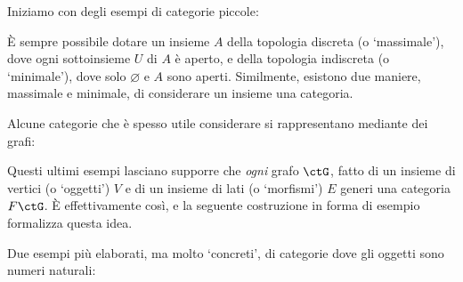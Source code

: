 Iniziamo con degli esempi di categorie piccole:
\begin{example}
\end{example}
\begin{example}
\end{example}
\`E sempre possibile dotare un insieme $A$ della topologia discreta (o `massimale'), dove ogni sottoinsieme $U$ di $A$ è aperto, e della topologia indiscreta (o `minimale'), dove solo $\varnothing$ e $A$ sono aperti. Similmente, esistono due maniere, massimale e minimale, di considerare un insieme una categoria.
\begin{example}
\end{example}
\begin{example}
\end{example}
Alcune categorie che è spesso utile considerare si rappresentano mediante dei grafi:
\begin{example}
\end{example}
\begin{example}
\end{example}
\begin{example}
\end{example}
\begin{example}
\end{example}
\begin{example}
\end{example}
Questi ultimi esempi lasciano supporre che \emph{ogni} grafo $\ctG$, fatto di un insieme di vertici (o `oggetti') $V$ e di un insieme di lati (o `morfismi') $E$ generi una categoria $F\ctG$. \`E effettivamente così, e la seguente costruzione in forma di esempio formalizza questa idea.
\begin{example}
\end{example}
Due esempi più elaborati, ma molto `concreti', di categorie dove gli oggetti sono numeri naturali:
